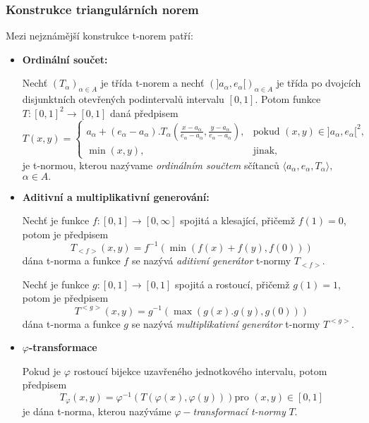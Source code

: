 \subsubsection{Konstrukce triangulárních norem}

Mezi nejznámější konstrukce t-norem patří:
\begin{itemize}
    \item \textbf{Ordinální součet:}\\
    \begin{definition}
    \cite{hlinena}
        Nech\v t $(T_\alpha)_{\alpha \in A}$ je třída t-norem a
        nech\v t $(]a_\alpha,e_\alpha[)_{\alpha \in A}$ je třída po dvojcích
        disjunktních otevřených podinterval\r u intervalu $[0,1].$ Potom funkce
        \hbox{$T:[0,1]^2\rightarrow [0,1]$} daná předpisem
        $$T(x,y)=\begin{cases} a_\alpha + (e_\alpha - a_\alpha ).T_\alpha (\frac
        {x-a_\alpha}{e_\alpha - a_\alpha}, \frac {y-a_\alpha}{e_\alpha - a_\alpha}),
        &\mbox {pokud $(x,y) \in ]a_\alpha ,e_\alpha [^2$,}
        \\\min(x,y), &\mbox {jinak,} \end{cases}$$
        je t-normou, kterou nazývame {\em ordinálním součtem} sčítanc\r u $\langle a_\alpha ,e_\alpha
        ,T_\alpha \rangle,$ \mbox{$ \alpha \in A.$}
    \end{definition}
    \item \textbf{Aditivní a multiplikativní generování:}
    \begin{definition}
        \cite{hlinena}
        Nech\v t je funkce $f:[0,1] \to [0,\infty]$ spojitá a klesající, přičemž
        $f(1)=0$, potom je předpisem
        $$ T_{<f>}(x,y)=f^{-1}(\min(f(x)+f(y),f(0)))$$
        dána t-norma a funkce $f$ se nazývá {\em aditivní generátor} t-normy
        $T_{<f>}.$
        
        Nech\v t je funkce $g:[0,1] \to [0,1]$ spojitá a rostoucí, přičemž
        $g(1)=1$, potom je předpisem
        $$ T^{<g>}(x,y)=g^{-1}(\max(g(x).g(y),g(0)))$$
        dána t-norma a funkce $g$ se nazývá {\em multiplikativní generátor} t-normy
        $T^{<g>}.$
    \end{definition}
    \item \textbf{$\varphi$-transformace}
    \begin{definition}
        \cite{hlinena}
        Pokud je $\varphi$ rostoucí bijekce uzavřeného jednotkového intervalu, potom
        předpisem
        $$T_\varphi (x,y)=\varphi ^{-1}(T(\varphi(x),\varphi(y))) \text {pro $(x,y)
        \in [0,1]$}$$
        je dána t-norma, kterou nazýváme $\varphi-${\em transformací t-normy}
        $T.$
    \end{definition}
\end{itemize}

